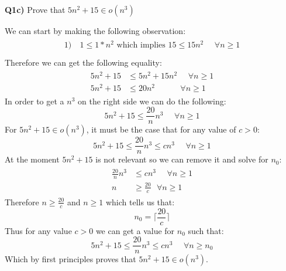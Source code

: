 \documentclass[12pt]{article}
\begin{document}
\newpage
\textbf{Q1c)} Prove that $5n^2 + 15 \in o(n^3)$\\
\begin{adjustwidth}{0pt}{0pt}
We can start by making the following observation:
\begin{align*}
    \begin{aligned}
		1)& \ 1 \leq 1*n^2 \textrm{  which implies   } 15 \leq 15n^2 \ \ \ \ \ \ \forall n \geq 1\\
    \end{aligned}
\end{align*}
Therefore we can get the following equality:
\begin{align*}
    \begin{aligned}
       5n^2 + 15 &\leq 5n^2 + 15n^2 \ \ \ \ \ \ \forall n \geq 1 \\
    	   5n^2 + 15  &\leq 20n^2 \ \ \ \ \ \ \ \ \ \ \ \ \ \ \forall n \geq 1
    \end{aligned}
\end{align*}
In order to get a $n^3$ on the right side we can do the following:
\[ 5n^2 + 15 \leq \frac{20}{n}n^3 \ \ \ \ \ \ \forall n \geq 1 \]
For $5n^2 + 15 \in o(n^3)$, it must be the case that for any value of $c > 0$:
\[ 5n^2 + 15 \leq \frac{20}{n}n^3 \leq cn^3\ \ \ \ \ \ \forall n \geq 1 \]
At the moment $5n^2 + 15$ is not relevant so we can remove it and solve for $n_0$:
\begin{align*}
    \begin{aligned}
       \frac{20}{n}n^3 &\leq cn^3 \ \ \ \ \ \ \forall n \geq 1 \\
    	   n &\geq \frac{20}{c} \ \ \ \forall n \geq 1
    \end{aligned}
\end{align*}
Therefore $n \geq \frac{20}{c}$ and $n \geq 1$ which tells us that:
{\boldmath \[ n_0 = \lceil \frac{20}{c} \rceil \]}
Thus for any value $c > 0$ we can get a value for $n_0$ such that:
\[ 5n^2 + 15 \leq \frac{20}{n}n^3 \leq cn^3\ \ \ \ \ \ \forall n \geq n_0 \]
Which by first principles proves that $5n^2 + 15 \in o(n^3)$.
\end{adjustwidth}
\end{document}
